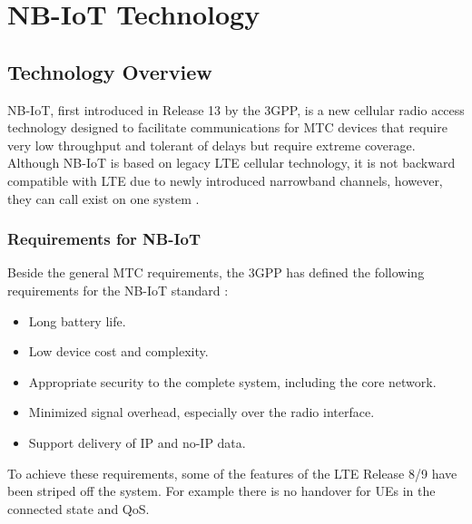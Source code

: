 \chapter{NB-IoT Technology} \label{chap2}

\section{Technology Overview}

NB-IoT, first introduced in Release 13 by the 3GPP, is a new cellular radio access technology designed to facilitate communications for MTC devices that require very low throughput and tolerant of delays but require extreme coverage. Although NB-IoT is based on legacy LTE cellular technology, it is not backward compatible with LTE due to newly introduced narrowband channels, however, they can call exist on one system \cite{NB_IoT-rohde, ubox_nb-iot, icumt2022}.

\subsection*{Requirements for NB-IoT}

Beside the general MTC requirements, the 3GPP has defined the following requirements for the NB-IoT standard \cite{NB_IoT-rohde, Masek2021, chap7_cellular-iot}:

\begin{itemize}
    \item Long battery life.
    \item Low device cost and complexity.
    \item Appropriate security to the complete system, including the core network.
    \item Minimized signal overhead, especially over the radio interface.
    \item Support delivery of IP and no-IP data.
\end{itemize}



To achieve these requirements, some of the features of the LTE Release 8/9 have been striped off the system. For example there is no handover for UEs in the connected state and QoS.

